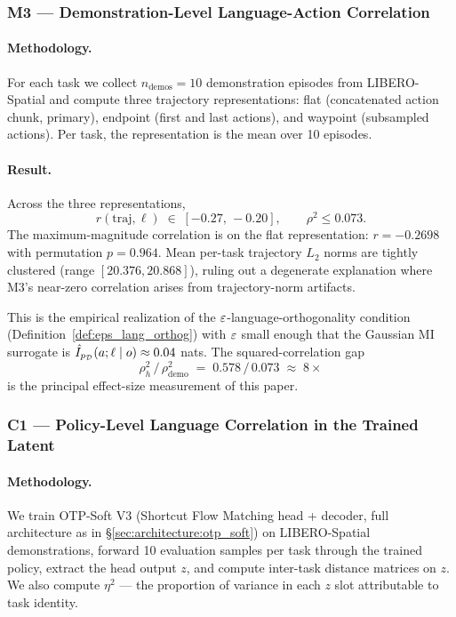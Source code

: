 \subsubsection{M3 --- Demonstration-Level Language-Action Correlation}
\label{sec:results:diagnostic:m3}

\paragraph{Methodology.}
For each task we collect $n_{\text{demos}} = 10$ demonstration episodes from
LIBERO-Spatial and compute three trajectory representations: flat (concatenated action
chunk, primary), endpoint (first and last actions), and waypoint (subsampled actions).
Per task, the representation is the mean over 10 episodes.

\paragraph{Result.}
Across the three representations,
\begin{equation}
r(\text{traj}, \ell) \;\in\; [-0.27,\, -0.20], \qquad \rho^2 \le 0.073.
\label{eq:m3_result}
\end{equation}
The maximum-magnitude correlation is on the flat representation: $r = -0.2698$ with
permutation $p = 0.964$. Mean per-task trajectory $L_2$ norms are tightly clustered
(range $[20.376, 20.868]$), ruling out a degenerate explanation where M3's near-zero
correlation arises from trajectory-norm artifacts.

This is the empirical realization of the $\varepsilon$-language-orthogonality condition
(Definition~\ref{def:eps_lang_orthog}) with $\varepsilon$ small enough that the Gaussian MI
surrogate is $\hat{I}_{p_{\mathcal{D}}}(a; \ell \mid o) \approx 0.04$ nats. The
squared-correlation gap
\begin{equation}
\rho_h^2 \,/\, \rho_{\text{demo}}^2 \;=\; 0.578 \,/\, 0.073 \;\approx\; 8\times
\label{eq:gap_result}
\end{equation}
is the principal effect-size measurement of this paper.

\subsubsection{C1 --- Policy-Level Language Correlation in the Trained Latent}
\label{sec:results:diagnostic:c1}

\paragraph{Methodology.}
We train OTP-Soft V3 (Shortcut Flow Matching head + decoder, full architecture as in
\S\ref{sec:architecture:otp_soft}) on LIBERO-Spatial demonstrations, forward 10
evaluation samples per task through the trained policy, extract the head output $z$, and
compute inter-task distance matrices on $z$. We also compute $\eta^2$ ---
the proportion of variance in each $z$ slot attributable to task identity.


